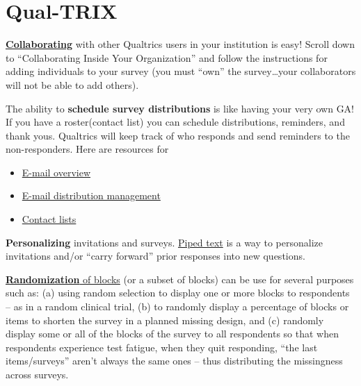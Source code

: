 \documentclass[
  english,
]{book}
\providecommand{\tightlist}{%
  \setlength{\itemsep}{0pt}\setlength{\parskip}{0pt}}
\begin{document}
\hypertarget{qual-trix}{%
\section{Qual-TRIX}\label{qual-trix}}

\href{https://www.qualtrics.com/support/survey-platform/my-projects/sharing-a-project/}{\textbf{Collaborating}} with other Qualtrics users in your institution is easy!
Scroll down to ``Collaborating Inside Your Organization'' and follow the instructions for adding individuals to your survey (you must ``own'' the survey\ldots your collaborators will not be able to add others).

The ability to \textbf{schedule survey distributions} is like having your very own GA! If you have a roster(contact list) you can schedule distributions, reminders, and thank yous. Qualtrics will keep track of who responds and send reminders to the non-responders. Here are resources for

\begin{itemize}
\tightlist
\item
  \href{https://www.qualtrics.com/support/survey-platform/distributions-module/email-distribution/emails/emails-overview/}{E-mail overview}\\
\item
  \href{https://www.qualtrics.com/support/survey-platform/distributions-module/email-distribution/emails/email-distribution-management/}{E-mail distribution management}\\
\item
  \href{https://www.qualtrics.com/support/survey-platform/contacts/creating-a-contact-list/}{Contact lists}
\end{itemize}

\textbf{Personalizing} invitations and surveys. \href{https://www.qualtrics.com/support/survey-platform/survey-module/editing-questions/piped-text/piped-text-overview/}{Piped text} is a way to personalize invitations and/or ``carry forward'' prior responses into new questions.

\href{https://www.qualtrics.com/support/survey-platform/survey-module/survey-flow/standard-elements/randomizer/}{\textbf{Randomization} of blocks} (or a subset of blocks) can be use for several purposes such as: (a) using random selection to display one or more blocks to respondents -- as in a random clinical trial, (b) to randomly display a percentage of blocks or items to shorten the survey in a planned missing design, and (c) randomly display some or all of the blocks of the survey to all respondents so that when respondents experience test fatigue, when they quit responding, ``the last items/surveys'' aren't always the same ones -- thus distributing the missingness across surveys.
\end{document}
